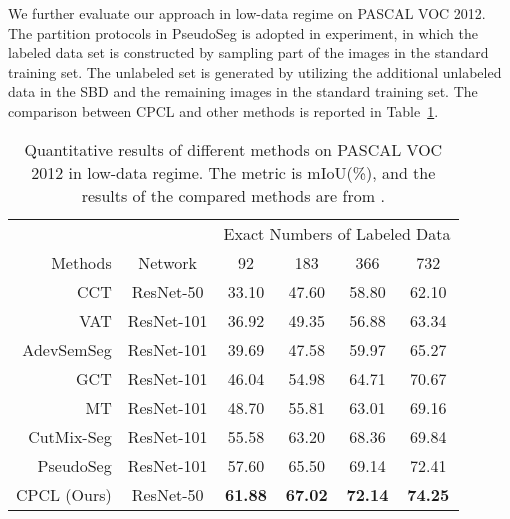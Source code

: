 \documentclass[journal]{IEEEtran}
\begin{document}
We further evaluate our approach in low-data regime on PASCAL VOC 2012. The partition protocols in PseudoSeg \cite{pseudoseg} is adopted in experiment, in which the labeled 
data set is constructed by sampling part of the images in the standard training set. The unlabeled set is generated by utilizing the additional unlabeled data in the SBD 
and the remaining images in the standard training set. The comparison between CPCL and other methods is reported in Table~\ref{tab:voc_few}.

\begin{table}[th]
  \footnotesize
  \caption{Quantitative results of different methods on PASCAL VOC 2012 in low-data regime. The metric is mIoU(\%), and the results of the compared methods are from \cite{pseudoseg}.
  }
  \begin{center}
  \renewcommand{\arraystretch}{1.3}
  \begin{tabular}{rccccc} 
  \hline
                               &              & \multicolumn{4}{c}{Exact Numbers of Labeled Data}          \\
    Methods                    & Network      & 92  & 183  & 366   & 732  \\ \hline
    CCT \cite{CCT}             & ResNet-50    & 33.10       & 47.60      & 58.80       & 62.10      \\
    VAT \cite{VAT}             & ResNet-101   & 36.92       & 49.35      & 56.88       & 63.34      \\
    AdevSemSeg \cite{ALS4}     & ResNet-101   & 39.69       & 47.58      & 59.97       & 65.27      \\
    GCT \cite{GCT}             & ResNet-101   & 46.04       & 54.98      & 64.71       & 70.67      \\
    MT \cite{MT}               & ResNet-101   & 48.70       & 55.81      & 63.01       & 69.16      \\                       
    CutMix-Seg \cite{2019Semi} & ResNet-101   & 55.58       & 63.20      & 68.36       & 69.84      \\
    PseudoSeg \cite{pseudoseg} & ResNet-101   & 57.60       & 65.50      & 69.14       & 72.41      \\ \hline

    CPCL (Ours)                & ResNet-50    & \bf 61.88   & \bf 67.02  & \bf 72.14   & \bf 74.25      \\ \hline
   
  \end{tabular}
  \end{center}
  \label{tab:voc_few}
\end{table}
\end{document}
